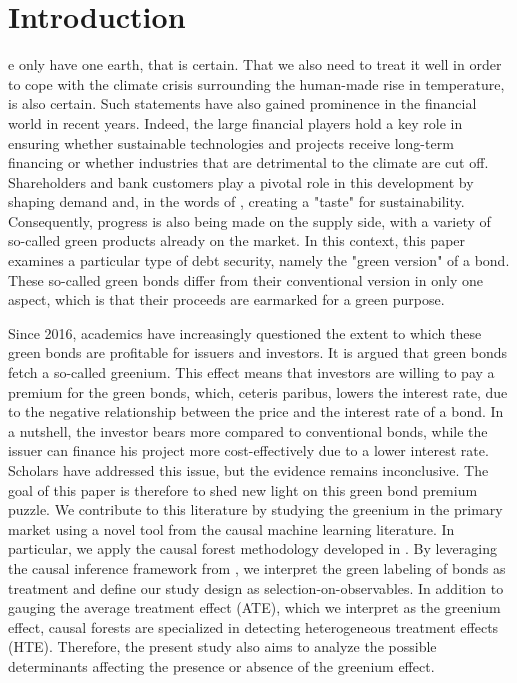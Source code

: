 %
%
\let\textcircled=\pgftextcircled
\chapter{Introduction}
\label{chap:intro}

e only have one earth, that is certain. That we also need to treat it well in order to cope with the climate crisis surrounding the human-made rise in temperature, is also certain. Such statements have also gained prominence in the financial world in recent years. Indeed, the large financial players hold a key role in ensuring whether sustainable technologies and projects receive long-term financing or whether industries that are detrimental to the climate are cut off. Shareholders and bank customers play a pivotal role in this development by shaping demand and, in the words of \citet{fama2007disagreement}, creating a "taste" for sustainability. Consequently, progress is also being made on the supply side, with a variety of so-called green products already on the market. In this context, this paper examines a particular type of debt security, namely the "green version" of a bond. These so-called green bonds differ from their conventional version in only one aspect, which is that their proceeds are earmarked for a green purpose. 

Since 2016, academics have increasingly questioned the extent to which these green bonds are profitable for issuers and investors. It is argued that green bonds fetch a so-called greenium. This effect means that investors are willing to pay a premium for the green bonds, which, ceteris paribus, lowers the interest rate, due to the negative relationship between the price and the interest rate of a bond. In a nutshell, the investor bears more compared to conventional bonds, while the issuer can finance his project more cost-effectively due to a lower interest rate. Scholars have addressed this issue, but the evidence remains inconclusive. The goal of this paper is therefore to shed new light on this green bond premium puzzle. We contribute to this literature by studying the greenium in the primary market using a novel tool from the causal machine learning literature. In particular, we apply the causal forest methodology developed in \citet{wager2018estimation}. By leveraging the causal inference framework from \citet{rubin1974estimating}, we interpret the green labeling of bonds as treatment and define our study design as selection-on-observables. In addition to gauging the average treatment effect (ATE), which we interpret as the greenium effect, causal forests are specialized in detecting heterogeneous treatment effects (HTE). Therefore, the present study also aims to analyze the possible determinants affecting the presence or absence of the greenium effect.

